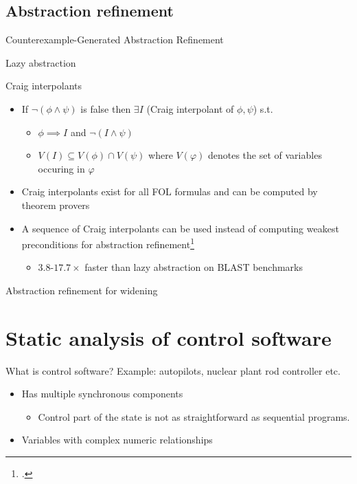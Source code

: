 \documentclass[aspectratio=169,14pt]{beamer}
\begin{document}
\subsection{Abstraction refinement}
\begin{frame}{Counterexample-Generated Abstraction Refinement}
\end{frame}
\begin{frame}{Lazy abstraction}
\end{frame}
\begin{frame}{Craig interpolants}
  \begin{itemize}[<+->]
  \item If $\neg (\phi \wedge \psi)$ is false then $\exists I$ (Craig interpolant of $\phi, \psi$) s.t.
    \begin{itemize}[<+->]
    \item $\phi \implies I$ and $\neg (I \wedge \psi)$
    \item $V(I) \subseteq V(\phi) \cap V(\psi)$ where $V(\varphi)$ denotes the set of variables occuring in $\varphi$
    \end{itemize}
  \item Craig interpolants exist for all FOL formulas and can be computed by theorem provers
  \item A sequence of Craig interpolants can be used instead of computing weakest preconditions for abstraction refinement\footcite{mcmillan2006lazy}\pause
    \begin{itemize}
    \item $3.8$-$17.7\times$ faster than lazy abstraction on BLAST benchmarks
    \end{itemize}
  \end{itemize}
\end{frame}
\begin{frame}{Abstraction refinement for widening}
\end{frame}

\section{Static analysis of control software}
\begin{frame}{What is control software?}
  Example: autopilots, nuclear plant rod controller etc.
  
  \begin{itemize}
  \item<2-> Has multiple synchronous components\pause
    \begin{itemize}
    \item<3-> Control part of the state is not as straightforward as sequential programs. 
    \end{itemize}
  \item<5-> Variables with complex numeric relationships
  \end{itemize}
\end{frame}
\end{document}
